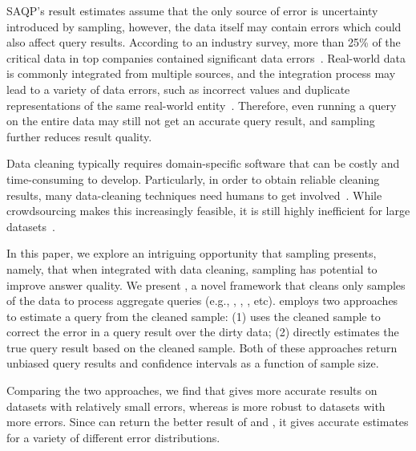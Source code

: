 SAQP's result estimates assume that the only source of error is uncertainty introduced by sampling, however, the data itself may contain errors which could also affect query results. 
According to an industry survey, more than 25\% of the critical data in top companies contained significant data errors~\cite{Gartner}.
Real-world data is commonly integrated from multiple sources, and the integration process may lead to a variety of data errors, such as incorrect values and duplicate representations of the same real-world entity~\cite{DBLP:journals/pvldb/DongS13}. 
Therefore, even running a query on the entire data may still not get an accurate query result, and sampling further reduces result quality.

Data cleaning typically requires domain-specific software that can be costly and time-consuming to develop. Particularly, in order to obtain reliable cleaning results, many data-cleaning techniques need humans to get involved~\cite{DBLP:conf/sigmod/JefferyFH08,DBLP:journals/pvldb/FanLMTY10,DBLP:journals/pvldb/YakoutENOI11}. While crowdsourcing makes this increasingly feasible, it is still highly inefficient for large datasets~\cite{DBLP:journals/pvldb/WangKFF12}. 

In this paper, we explore an intriguing opportunity that sampling presents, namely, that when integrated with data cleaning, sampling has potential to improve answer quality.
We present \saqpplus, a novel framework that cleans only samples of the data to process aggregate queries (e.g., \avgfunc, \countfunc, \sumfunc, etc). \saqpplus employs two approaches to estimate a query from the cleaned sample: (1) \biascorrected uses the cleaned sample to correct the error in a query result over the dirty data; (2) \sampleclean directly estimates the true query result based on the cleaned sample. 
Both of these approaches return unbiased query results and confidence intervals as a function of sample size.

Comparing the two approaches, we find that \biascorrected gives more accurate results on datasets with relatively small errors, whereas \sampleclean is more robust to datasets with more errors.
Since \saqpplus can return the better result of \biascorrected and \sampleclean, it gives accurate estimates for a variety of different error distributions. %



